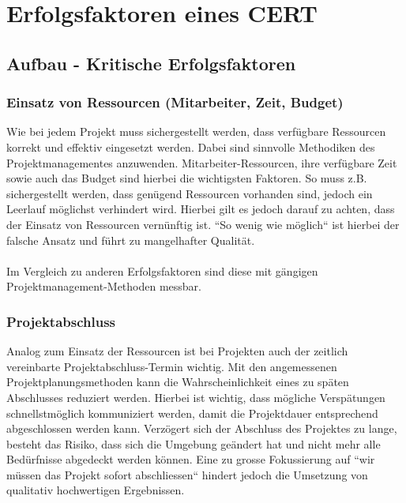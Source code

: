 \chapter{Erfolgsfaktoren eines CERT}

\ifpdf
    \graphicspath{{Chapter3/Figs/Raster/}{Chapter3/Figs/PDF/}{Chapter3/Figs/}}
\else
    \graphicspath{{Chapter3/Figs/Vector/}{Chapter3/Figs/}}
\fi

\section{Aufbau - Kritische Erfolgsfaktoren}

\subsection{Einsatz von Ressourcen (Mitarbeiter, Zeit, Budget)}
Wie bei jedem Projekt muss sichergestellt werden, dass verfügbare Ressourcen korrekt und effektiv eingesetzt werden. Dabei sind sinnvolle Methodiken des Projektmanagementes anzuwenden. Mitarbeiter-Ressourcen, ihre verfügbare Zeit sowie auch das Budget sind hierbei die wichtigsten Faktoren. So muss z.B. sichergestellt werden, dass genügend Ressourcen vorhanden sind, jedoch ein Leerlauf möglichst verhindert wird. Hierbei gilt es jedoch darauf zu achten, dass der Einsatz von Ressourcen vernünftig ist. ``So wenig wie möglich`` ist hierbei der falsche Ansatz und führt zu mangelhafter Qualität.\\
\\
Im Vergleich zu anderen Erfolgsfaktoren sind diese mit gängigen Projektmanagement-Methoden messbar.

\subsection{Projektabschluss}
Analog zum Einsatz der Ressourcen ist bei Projekten auch der zeitlich vereinbarte Projektabschluss-Termin wichtig. Mit den angemessenen Projektplanungsmethoden kann die Wahrscheinlichkeit eines zu späten Abschlusses reduziert werden. Hierbei ist wichtig, dass mögliche Verspätungen schnellstmöglich kommuniziert werden, damit die Projektdauer entsprechend abgeschlossen werden kann. Verzögert sich der Abschluss des Projektes zu lange, besteht das Risiko, dass sich die Umgebung geändert hat und nicht mehr alle Bedürfnisse abgedeckt werden können. Eine zu grosse Fokussierung auf ``wir müssen das Projekt sofort abschliessen`` hindert jedoch die Umsetzung von qualitativ hochwertigen Ergebnissen.

